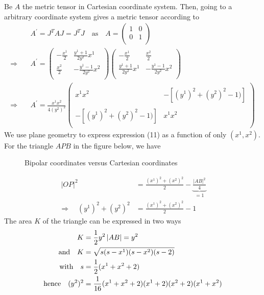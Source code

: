 \newpage
Be $A$ the metric tensor in Cartesian coordinate system. Then, going to a arbitrary coordinate system gives a metric tensor according to  
\begin{align}
\ & A^{'} = J^TAJ =J^TJ \quad \text{as}\quad A = \begin{pmatrix}
1 &0 \\
0& 1 \\
\end{pmatrix}\\
\Rightarrow\quad & A^{'} = \begin{pmatrix}
-\frac{x^1}{2} & \frac{y^1+1}{2y^2}x^1 \\
\frac{x^2}{2} & -\frac{y^1-1}{2y^2}x^2 \\
\end{pmatrix}\begin{pmatrix}
-\frac{x^1}{2} &\frac{x^2}{2}  \\
\frac{y^1+1}{2y^2}x^1 & -\frac{y^1-1}{2y^2}x^2 \\
\end{pmatrix}\\
\Rightarrow\quad & A^{'} =\frac{x^1x^2}{4(y^2)^2} \begin{pmatrix}
\ & \\
x^1x^2 &-\left[(y^1)^2 +(y^2)^2-1)\right] \\\\
-\left[(y^1)^2 +(y^2)^2-1)\right]  &x^1x^2\\
\ & 
\end{pmatrix}
\end{align}
We use plane geometry to express expression (11) as  a function of only $(x^1,x^2)$. For the triangle $APB$ in the figure below, we have
\begin{figure}[h]

\caption{Bipolar coordinates versus Cartesian coordinates}
\label{fig:fig_p79_260_b}
\end{figure}
\begin{align}
\ \left |  OP \right |^2 &= \frac{(x^1)^2+(x^2)^2}{2} - \underbrace{\frac{\left | AB \right|^2}{4}}_{=1}\\
\Rightarrow\quad (y^1)^2 +(y^2)^2 &= \frac{(x^1)^2+(x^2)^2}{2} - 1
\end{align}
The area $K$ of the triangle can be expressed in two ways
\begin{align}
\ K &= \frac{1}{2} y^2\left | AB \right| = y^2\\
\text{and} \quad K &= \sqrt{s(s-x^1)(s-x^2)(s-2)}\\
\text{with}\quad s &= \frac{1}{2} (x^1+x^2+2)\\
\text{hence}\quad (y^2)^2 &= \frac{1}{16}(x^1+x^2+2)(x^1+2)(x^2+2)(x^1+x^2)
\end{align}
